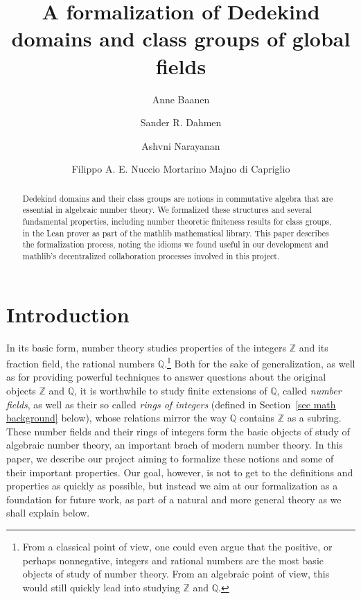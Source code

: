 \documentclass[a4paper,USenglish,cleveref, autoref, thm-restate]{lipics-v2021}
\title{A formalization of Dedekind domains and class groups of global fields}
\author{Anne Baanen}{Department of Computer Science, Vrije Universiteit Amsterdam, The Netherlands \and \url{https://cs.vu.nl/~tbn305}}{t.baanen@vu.nl}{https://orcid.org/0000-0001-8497-3683}
{NWO Vidi grant No. 016.Vidi.189.037, Lean Forward}
\author{Sander R. Dahmen}{Department of Mathematics, Vrije Universiteit Amsterdam, The Netherlands \and \url{https://few.vu.nl/~sdn249/}}{s.r.dahmen@vu.nl}{https://orcid.org/0000-0002-0014-0789}{NWO Vidi grant No. 639.032.613, New Diophantine Directions}
\author{Ashvni Narayanan}{London School of Geometry and Number Theory}{a.narayanan20@imperial.ac.uk}{orcID?}{EPSRC, UK}
\author{Filippo A. E. Nuccio Mortarino Majno di Capriglio}{Univ Lyon, Université Jean Monnet Saint-Étienne, CNRS UMR 5208, Institut Camille Jordan, F-42023 Saint-\'Etienne, France\and\url {https://perso.univ-st-etienne.fr/nf51454h/index.html}}{filippo.nuccio@univ-st-etienne.fr}{https://orcid.org/0000-0002-5318-9869}{\empty}
\newcommand{\Q}{\mathbb{Q}}
\newcommand{\Z}{\mathbb{Z}}
\begin{document}
\maketitle

\begin{abstract}
Dedekind domains and their class groups are notions in commutative algebra that are essential in algebraic number theory.
We formalized these structures and several fundamental properties, including number theoretic finiteness results for class groups, in the Lean prover as part of the mathlib mathematical library.
This paper describes the formalization process,
noting the idioms we found useful in our development
and mathlib's decentralized collaboration processes involved in this project.
\end{abstract}

\section{Introduction}

In its basic form, number theory studies properties of the integers $\Z$
and its fraction field, the rational numbers $\Q$.\footnote{From a classical point of view, one could even argue that the positive, or perhaps nonnegative, integers and rational numbers are the most basic objects of study of number theory. From an algebraic point of view, this would still quickly lead into studying $\Z$ and $\Q$.}
Both for the sake of generalization, as well as for providing powerful techniques to answer questions about the original objects $\Z$ and $\Q$,
it is worthwhile to study finite extensions of $\Q$, called \emph{number fields}, as well as their so called \emph{rings of integers} (defined in Section~\ref{sec math background} below),
whose relations mirror the way $\Q$ contains $\Z$ as a subring.
These number fields and their rings of integers form the basic objects of study of algebraic number theory, an important brach of modern number theory.
In this paper, we describe our project aiming to formalize these notions and some of their important properties.
Our goal, however, is not to get to the definitions and properties as quickly as possible,
but instead we aim at our formalization as a foundation for future work,
as part of a natural and more general theory as we shall explain below.
\end{document}
